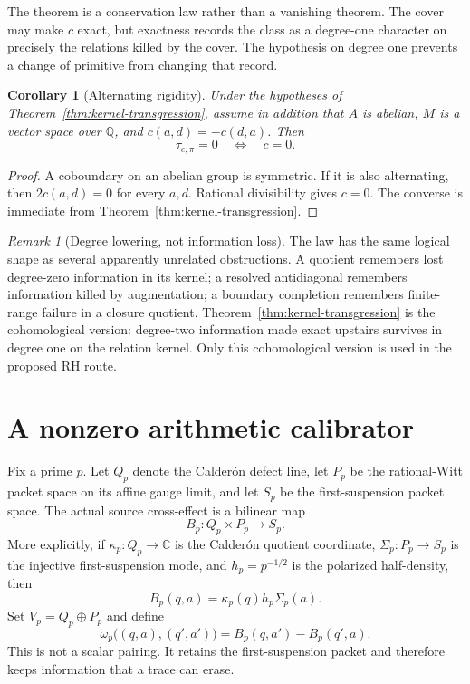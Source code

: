 \documentclass[11pt]{article}
\newtheorem{corollary}[theorem]{Corollary}
\theoremstyle{definition}
\theoremstyle{remark}
\newtheorem{remark}[theorem]{Remark}
\numberwithin{equation}{section}
\newcommand{\C}{\mathbb C}
\newcommand{\Q}{\mathbb Q}
\begin{document}
The theorem is a conservation law rather than a vanishing theorem.  The
cover may make $c$ exact, but exactness records the class as a degree-one
character on precisely the relations killed by the cover.  The hypothesis
on degree one prevents a change of primitive from changing that record.

\begin{corollary}[Alternating rigidity]
\label{cor:alternating-rigidity}
Under the hypotheses of Theorem~\ref{thm:kernel-transgression}, assume in
addition that $A$ is abelian, $M$ is a vector space over $\Q$, and
$c(a,d)=-c(d,a)$.  Then
\[
               \tau_{c,\pi}=0
        \quad\Longleftrightarrow\quad c=0.
\]
\end{corollary}

\begin{proof}
A coboundary on an abelian group is symmetric.  If it is also alternating,
then $2c(a,d)=0$ for every $a,d$.  Rational divisibility gives $c=0$.
The converse is immediate from Theorem~\ref{thm:kernel-transgression}.
\end{proof}

\begin{remark}[Degree lowering, not information loss]
The law has the same logical shape as several apparently unrelated
obstructions.  A quotient remembers lost degree-zero information in its
kernel; a resolved antidiagonal remembers information killed by
augmentation; a boundary completion remembers finite-range failure in a
closure quotient.  Theorem~\ref{thm:kernel-transgression} is the
cohomological version: degree-two information made exact upstairs survives
in degree one on the relation kernel.  Only this cohomological version is
used in the proposed RH route.
\end{remark}

\section{A nonzero arithmetic calibrator}

Fix a prime $p$.  Let $Q_p$ denote the Calder\'on defect line, let $P_p$ be
the rational-Witt packet space on its affine gauge limit, and let $S_p$ be
the first-suspension packet space.  The actual source cross-effect is a
bilinear map
\[
                         B_p:Q_p\times P_p\longrightarrow S_p.
\]
More explicitly, if $\kappa_p:Q_p\to\C$ is the Calder\'on quotient
coordinate, $\Sigma_p:P_p\to S_p$ is the injective first-suspension mode,
and $h_p=p^{-1/2}$ is the polarized half-density, then
\begin{equation}
                         B_p(q,a)=\kappa_p(q)h_p\Sigma_p(a).
 \label{eq:cross-effect}
\end{equation}
Set $V_p=Q_p\oplus P_p$ and define
\begin{equation}
 \omega_p\bigl((q,a),(q',a')\bigr)
       =B_p(q,a')-B_p(q',a).
 \label{eq:CW-cup}
\end{equation}
This is not a scalar pairing.  It retains the first-suspension packet and
therefore keeps information that a trace can erase.
\end{document}
